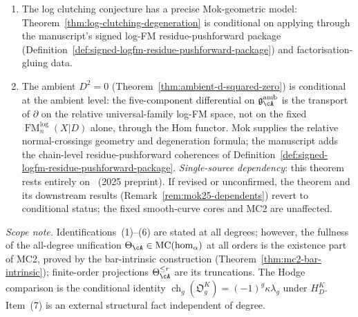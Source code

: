 \begin{remark}
\begin{enumerate}[label=\textup{(\arabic*)}]
 additive, tree) biject with the three classes of rigid
 combinatorial types at degree~$4$
 (Construction~\ref{constr:degree4-degeneration}).
\item The log clutching conjecture has a precise Mok-geometric model:
 Theorem~\ref{thm:log-clutching-degeneration} is conditional on
 applying \cite[Corollary~5.3.4]{Mok25} through the manuscript's
 signed log-FM residue-pushforward package
 (Definition~\ref{def:signed-logfm-residue-pushforward-package})
 and factorisation-gluing data.
\item The ambient $D^2 = 0$
 (Theorem~\ref{thm:ambient-d-squared-zero}) is conditional at the
 ambient level: the five-component differential on
 $\mathfrak{g}^{\mathrm{amb}}_{\cA}$ is the transport of
 $\partial$ on the relative universal-family log-FM space, not on the
 fixed $\operatorname{FM}_n^{\mathrm{log}}(X|D)$ alone, through the Hom
 functor. Mok supplies the relative normal-crossings geometry and
 degeneration formula; the manuscript adds the chain-level
 residue-pushforward coherences of
 Definition~\ref{def:signed-logfm-residue-pushforward-package}.
 \emph{Single-source dependency}: this theorem rests entirely
 on~\cite{Mok25} (2025 preprint). If revised or unconfirmed,
 the theorem and its downstream results
 (Remark~\ref{rem:mok25-dependents}) revert to conditional
 status; the fixed smooth-curve cores and MC2 are unaffected.
\end{enumerate}
\emph{Scope note.} Identifications~(1)--(6) are stated at all
degrees; however, the fullness of the all-degree unification
$\Theta_\cA \in \mathrm{MC}(\operatorname{hom}_\alpha)$ at all orders
is the existence part of MC2, proved by the bar-intrinsic construction
\textup{(}Theorem~\ref{thm:mc2-bar-intrinsic}\textup{)}; finite-order
projections $\Theta_\cA^{\leq r}$ are its truncations.  The Hodge
comparison is the conditional identity
$\operatorname{ch}_g(\mathfrak O_g^K)=(-1)^g\kappa\lambda_g$ under
$H_D^K$. Item~(7) is an external structural fact independent of degree.


\end{remark}
